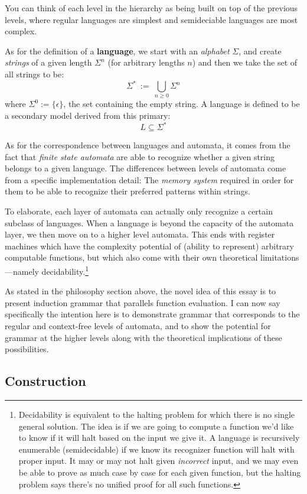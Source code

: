\documentclass[twoside]{article}
\newcommand{\strong}[1]{{\bfseries #1}}
\begin{document}
You can think of each level in the hierarchy as being built on top of the previous levels, where regular languages are
simplest and semideciable languages are most complex.

As for the definition of a \strong{language}, we start with an \emph{alphabet} $ \Sigma $, and create \emph{strings}
of a given length $ \Sigma^n $ (for arbitrary lengths $ n $) and then we take the set of all strings to be:
$$ \Sigma^* \ :=\ \bigcup_{n\ge 0}\Sigma^n $$
where $ \Sigma^0 := \{\epsilon\} $, the set containing the empty string.
A language is defined to be a secondary model derived from this primary:
$$ L \subseteq \Sigma^* $$

As for the correspondence between languages and automata, it comes from the fact that \emph{finite state automata} are
able to recognize whether a given string belongs to a given language. The differences between levels of automata come
from a specific implementation detail: The \emph{memory system} required in order for them to be able to recognize
their preferred patterns within strings.

To elaborate, each layer of automata can actually only recognize a certain subclass of languages. When a language is beyond
the capacity of the automata layer, we then move on to a higher level automata. This ends with register machines which have
the complexity potential of (ability to represent) arbitrary computable functions, but which also come with their own
theoretical limitations---namely decidability.\footnote{Decidability is equivalent to the halting problem for which there
is no single general solution.  The idea is if we are going to compute a function we'd like to know if it will halt based
on the input we give it.  A language is recursively enumerable (semidecidable) if we know its recognizer function will
halt with proper input.  It may or may not halt given \emph{incorrect} input, and we may even be able to prove as much
case by case for each given function, but the halting problem says there's no unified proof for all such functions.}

As stated in the philosophy section above, the novel idea of this essay is to present induction grammar that parallels
function evaluation. I can now say specifically the intention here is to demonstrate grammar that corresponds to the regular
and context-free levels of automata, and to show the potential for grammar at the higher levels along with the theoretical
implications of these possibilities.

\subsection*{Construction}
\end{document}
